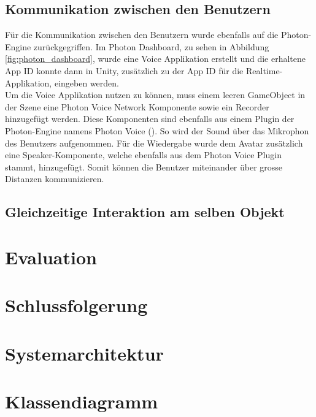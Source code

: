 \subsection{Kommunikation zwischen den Benutzern}

Für die Kommunikation zwischen den Benutzern wurde ebenfalls auf die Photon-Engine zurückgegriffen. Im Photon Dashboard, zu sehen in Abbildung \ref{fig:photon_dashboard}, wurde eine Voice Applikation erstellt und die erhaltene App ID konnte dann in Unity, zusätzlich zu der App ID für die Realtime-Applikation, eingeben werden. \\

\noindent Um die Voice Applikation nutzen zu können, muss einem leeren GameObject in der Szene eine \grqq Photon Voice Network\grqq{} Komponente sowie ein \grqq Recorder\grqq{} hinzugefügt werden. Diese Komponenten sind ebenfalls aus einem Plugin der Photon-Engine namens Photon Voice (\cite{noauthor_photon_2019-1}). So wird der Sound über das Mikrophon des Benutzers aufgenommen. Für die Wiedergabe wurde dem Avatar zusätzlich eine \grqq Speaker\grqq{}-Komponente, welche ebenfalls aus dem Photon Voice Plugin stammt, hinzugefügt. Somit können die Benutzer miteinander über grosse Distanzen kommunizieren. 

\subsection{Gleichzeitige Interaktion am selben Objekt}



\section{Evaluation}

\section{Schlussfolgerung}

\section{Systemarchitektur}

\section{Klassendiagramm}